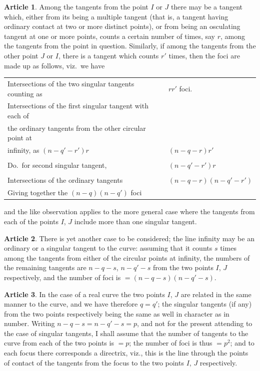 \documentclass[11pt,a4paper]{article}
\theoremstyle{definition}
\newtheorem{art}{Article}
\begin{document}
\begin{art}
Among the tangents from the point $I$ or $J$ there may be a tangent which, either from its being a multiple tangent (that is, a tangent having ordinary contact at two or more distinct points), or from being an osculating tangent at one or more points, counts a certain number of times, say $r$, among the tangents from the point in question. Similarly, if among the tangents from the other point $J$ or $I$, there is a tangent which counts $r'$ times, then the foci are made up as follows, viz.\ we have
\begin{center}
\begin{tabular}{@{}l@{\ }l@{}}
Intersections of the two singular tangents counting as & $rr'$ foci. \\
Intersections of the first singular tangent with each of & \\
the ordinary tangents from the other circular point at & \\
infinity, as $(n - q' - r')r$ & $(n - q - r)r'$ \\ \\
Do.\ for second singular tangent, & $(n - q' - r')r$ \\ \\
Intersections of the ordinary tangents & $(n - q - r)(n - q' - r')$ \\
\midrule
Giving together the $(n - q)(n - q')$ foci & \\
\end{tabular}
\end{center}
and the like observation applies to the more general case where the tangents from each of the points $I$, $J$ include more than one singular tangent.
\end{art}

\begin{art}
There is yet another case to be considered; the line infinity may be an ordinary or a singular tangent to the curve: assuming that it counts $s$ times among the tangents from either of the circular points at infinity, the numbers of the remaining tangents are $n - q - s$, $n - q' - s$ from the two points $I$, $J$ respectively, and the number of foci is $= (n - q - s)(n - q' - s)$.
\end{art}

\begin{art}
In the case of a real curve the two points $I$, $J$ are related in the same manner to the curve, and we have therefore $q = q'$; the singular tangents (if any) from the two points respectively being the same as well in character as in number. Writing $n - q - s = n - q' - s = p$, and not for the present attending to the case of singular tangents, I shall assume that the number of tangents to the curve from each of the two points is $= p$; the number of foci is thus $= p^{2}$; and to each focus there corresponds a directrix, viz., this is the line through the points of contact of the tangents from the focus to the two points $I$, $J$ respectively.
\end{art}
\end{document}
